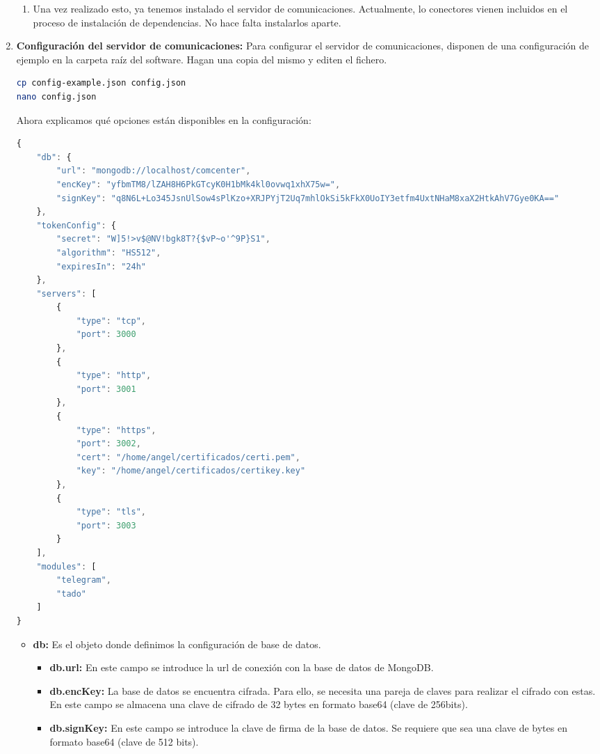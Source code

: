 \documentclass[spanish,12pt, a4paper, twoside]{paper}
\begin{document}
\begin{enumerate}
\begin{enumerate}
\item Una vez realizado esto, ya tenemos instalado el servidor de comunicaciones. Actualmente, lo conectores vienen incluidos en el proceso de instalación de dependencias. No hace falta instalarlos aparte.
\end{enumerate}

\item\textbf{Configuración del servidor de comunicaciones:} Para configurar el servidor de comunicaciones, disponen de una configuración de ejemplo en la carpeta raíz del software. Hagan una copia del mismo y editen el fichero.

\begin{lstlisting}[language=sh]
cp config-example.json config.json
nano config.json
\end{lstlisting}

Ahora explicamos qué opciones están disponibles en la configuración:
\begin{lstlisting}[language=JavaScript]
{
	"db": {
		"url": "mongodb://localhost/comcenter",
		"encKey": "yfbmTM8/lZAH8H6PkGTcyK0H1bMk4kl0ovwq1xhX75w=",
		"signKey": "q8N6L+Lo345JsnUlSow4sPlKzo+XRJPYjT2Uq7mhlOkSi5kFkX0UoIY3etfm4UxtNHaM8xaX2HtkAhV7Gye0KA=="
	},
	"tokenConfig": {
		"secret": "W]5!>v$@NV!bgk8T?{$vP~o'^9P}S1",
		"algorithm": "HS512",
		"expiresIn": "24h"
	},
	"servers": [
		{
			"type": "tcp",
			"port": 3000
		},
		{
			"type": "http",
			"port": 3001
		},
		{
			"type": "https",
			"port": 3002,
			"cert": "/home/angel/certificados/certi.pem",
			"key": "/home/angel/certificados/certikey.key"
		},
		{
			"type": "tls",
			"port": 3003
		}
	],
	"modules": [
		"telegram",
		"tado"
	]
}
\end{lstlisting}

\begin{itemize}
\item\textbf{db:} Es el objeto donde definimos la configuración de base de datos.
\begin{itemize}
\item\textbf{db.url:} En este campo se introduce la url de conexión con la base de datos de MongoDB.

\item\textbf{db.encKey:} La base de datos se encuentra cifrada. Para ello, se necesita una pareja de claves para realizar el cifrado con estas. En este campo se almacena una clave de cifrado de 32 bytes en formato base64 (clave de 256bits).

\item\textbf{db.signKey:} En este campo se introduce la clave de firma de la base de datos. Se requiere que sea una clave de bytes en formato base64 (clave de 512 bits).


\end{itemize}
\end{itemize}
\end{enumerate}
\end{document}
